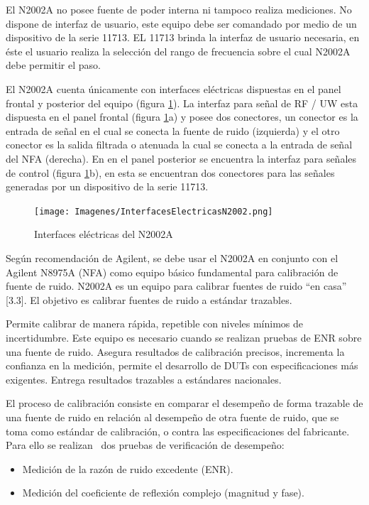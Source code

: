 El N2002A no posee fuente de poder interna ni tampoco realiza mediciones. No dispone de interfaz de usuario, este equipo debe ser comandado por medio de un dispositivo de la serie 11713. EL 11713 brinda la interfaz de usuario necesaria, en	éste el usuario realiza la selección del rango de frecuencia sobre el cual N2002A debe permitir el paso.		

El N2002A cuenta únicamente con interfaces eléctricas dispuestas en el panel frontal y posterior del equipo (figura \ref{Fig:InterfacesElectricasN2002}). La interfaz para señal de RF / UW esta dispuesta en el panel frontal (figura	\ref{Fig:InterfacesElectricasN2002}a) y posee dos conectores, un conector es la entrada de señal en el cual se conecta la fuente de	ruido (izquierda) y el otro conector es la salida filtrada o atenuada la cual se conecta a la entrada de señal del NFA (derecha). En en el panel posterior se encuentra la interfaz para señales de control (figura \ref{Fig:InterfacesElectricasN2002}b), en esta se encuentran dos conectores para las señales generadas por un dispositivo de la serie 11713.			

\begin{figure}[h!]
	\centering
	\texttt{[image: Imagenes/InterfacesElectricasN2002.png]}
	\caption{Interfaces eléctricas del N2002A}			
	\label{Fig:InterfacesElectricasN2002}
\end{figure}

Según recomendación de Agilent, se debe usar el N2002A en conjunto con el Agilent N8975A (NFA) como equipo básico fundamental para calibración de fuente de ruido. N2002A es un equipo para calibrar fuentes de ruido “en casa” [3.3]. El objetivo es calibrar fuentes de ruido a estándar trazables.

Permite calibrar de manera rápida, repetible con niveles mínimos de incertidumbre. Este equipo es necesario cuando se	realizan pruebas de ENR sobre una fuente de ruido. Asegura resultados de calibración precisos, incrementa la confianza en la medición, permite el desarrollo de DUTs con especificaciones más exigentes. Entrega resultados trazables a 	estándares nacionales.

El proceso de calibración consiste en comparar el desempeño de forma trazable de una fuente de ruido en relación al desempeño de otra fuente de ruido, que se toma como estándar de calibración, o contra las especificaciones del fabricante. Para ello se realizan \ dos pruebas de verificación de desempeño: 

\begin{itemize}
\item Medición de la razón de ruido excedente (ENR).
\item Medición del coeficiente de reflexión complejo (magnitud y fase). 
\end{itemize}

